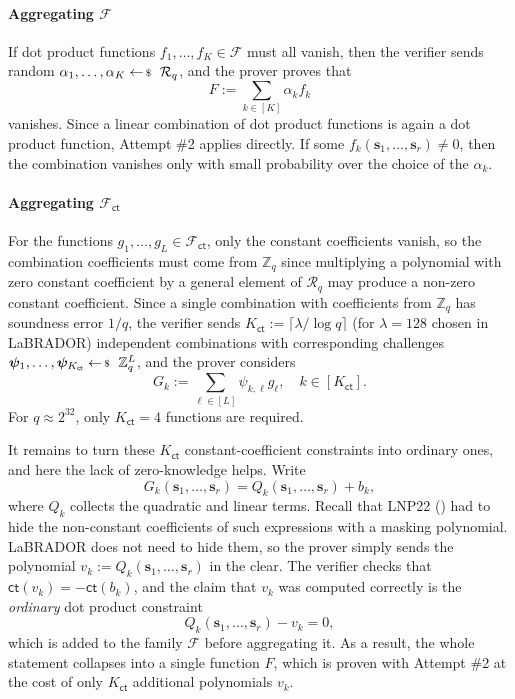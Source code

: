 \documentclass[../../book.tex]{subfiles}
\begin{document}
\paragraph{Aggregating $\mathcal{F}$}
If dot product functions $f_1,\dots,f_K \in \mathcal{F}$ must all vanish, then the verifier sends random $\alpha_1, \dots, \alpha_K \leftarrowS \mathcal{R}_q$, and the prover proves that
\begin{equation*}
    F := \sum_{k \in [K]} \alpha_kf_k
\end{equation*}
vanishes.
Since a linear combination of dot product functions is again a dot product function, Attempt \#2 applies directly.
If some $f_k(\mathbf{s}_1, \dots, \mathbf{s}_r) \neq 0$, then the combination vanishes only with small probability over the choice of the $\alpha_k$.

\paragraph{Aggregating $\mathcal{F}_{\mathsf{ct}}$}
For the functions $g_1,\dots,g_L \in \mathcal{F}_{\mathsf{ct}}$, only the constant coefficients vanish, so the combination coefficients must come from $\mathbb{Z}_q$ since multiplying a polynomial with zero constant coefficient by a general element of $\mathcal{R}_q$ may produce a non-zero constant coefficient.
Since a single combination with coefficients from $\mathbb{Z}_q$ has soundness error $1/q$, the verifier sends $K_{\mathsf{ct}} := \lceil \lambda/\log q \rceil$ (for $\lambda=128$ chosen in LaBRADOR) independent combinations with corresponding challenges $\boldsymbol{\psi}_1, \dots, \boldsymbol{\psi}_{K_{\mathsf{ct}}} \leftarrowS \mathbb{Z}_q^L$, and the prover considers
\begin{equation*}
    G_k := \sum_{\ell \in [L]} \psi_{k,\ell}g_{\ell}, \quad k \in [K_{\mathsf{ct}}].
\end{equation*}
For $q \approx 2^{32}$, only $K_{\mathsf{ct}} = 4$ functions are required.

It remains to turn these $K_{\mathsf{ct}}$ constant-coefficient constraints into ordinary ones, and here the lack of zero-knowledge helps.
Write
\begin{equation*}
    G_k(\mathbf{s}_1,\dots,\mathbf{s}_r) = Q_k(\mathbf{s}_1, \dots, \mathbf{s}_r) + b_k,
\end{equation*}
where $Q_k$ collects the quadratic and linear terms.
Recall that LNP22 () had to hide the non-constant coefficients of such expressions with a masking polynomial.
LaBRADOR does not need to hide them, so the prover simply sends the polynomial $v_k := Q_k(\mathbf{s}_1, \dots, \mathbf{s}_r)$ in the clear.
The verifier checks that $\mathsf{ct}(v_k) = -\mathsf{ct}(b_k)$, and the claim that $v_k$ was computed correctly is the \emph{ordinary} dot product constraint
\begin{equation*}
    Q_k(\mathbf{s}_1, \dots, \mathbf{s}_r) - v_k = 0,
\end{equation*}
which is added to the family $\mathcal{F}$ before aggregating it.
As a result, the whole statement collapses into a single function $F$, which is proven with Attempt \#2 at the cost of only $K_{\mathsf{ct}}$ additional polynomials $v_k$.
\end{document}
